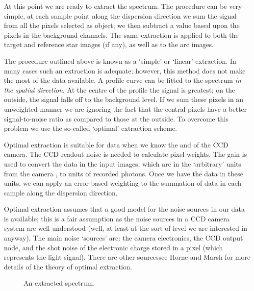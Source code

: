 At this point we are ready to extract the spectrum.
The procedure can be very simple, at each sample point along the
dispersion direction we sum the signal from all the pixels selected
as object; we then subtract a value based upon the pixels in the
background channels.
The same extraction is applied to both the target and reference star
images (if any), as well as to the arc images.

The procedure outlined above is known as a `simple' or `linear' extraction.
In many cases such an extraction is adequate; however,
this method does not make the most of the data available.
A profile curve can be fitted to the spectrum {\em in the spatial direction}.
At the centre of the profile the signal is greatest;
on the outside, the signal falls off to the background level.
If we sum these pixels in an unweighted manner we are ignoring the
fact that the central pixels have a better signal-to-noise ratio as
compared to those at the outside.
To overcome this problem we use the so-called `optimal' extraction scheme.

Optimal extraction is suitable for  data
when we know the  and
 of the CCD camera.
The CCD readout noise is needed to calculate pixel weights.
The gain is used to convert the data in the input images, which are
in the `arbitrary' units from the camera , to
units of recorded photons.
Once we have the data in these units, we can apply an error-based weighting
to the summation of data in each sample along the dispersion direction.

Optimal extraction assumes that a good model for the noise
sources in our data is available; this is a fair assumption as the noise
sources in a CCD camera system are well understood (well, at least at the
sort of level we are interested in anyway).
The main noise `sources' are: the camera electronics, the CCD output node,
and the shot noise of the electronic charge stored in a pixel (which
represents the light signal).
There are other sources\scspec{---}{ - }see Horne\cite{horne} and
Marsh\cite{marsh} for more details of the theory of optimal extraction.

\begin{figure}
\begin{center}
{\leavevmode\epsfysize=136mm}

\parbox{140mm}{
\caption{An extracted spectrum.}
\label{fi_extracted_spectrum}
}
\end{center}
\end{figure}

